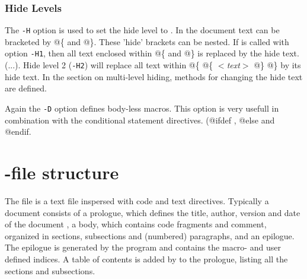 \subsubsection{Hide Levels}
The {\tt -H\n} option is used to set the hide level to \n. In the \Mx
document text can be bracketed by @\{ and @\}. These 'hide'
brackets can be nested. If \Mx is called with option {\tt -H1}, then
all text enclosed within @\{ and @\} is replaced by the hide text.
(...). Hide level 2 ({\tt -H2}) will replace all text within 
@\{ @\{ {\it $<$text$>$} @\} @\} by its hide text. 
In the section on multi-level hiding, methods for changing the hide
text are defined.

Again the {\tt -D\macro} option defines body-less macros.
This option is very usefull in combination with the conditional
statement directives. (@ifdef \macro, @else and @endif.

\section{\Mx-file structure}
The \Mx file is a text file inspersed with code and text directives.
Typically a \Mx document consists of a prologue, which defines the
title, author, version and date of the document , a body, which
contains code fragments and comment, organized in sections,
subsections and (numbered) paragraphs, and an epilogue. The epilogue
is generated by the \Mx program and contains the macro- and user
defined indices. A table of contents is added by \Mx to the prologue,
listing all the sections and subsections.


